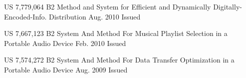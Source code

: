 \vspace{-3mm}

\begin{cvhonors}
  \cvhonor
    {US 7,779,064 B2} %
    {Method and System for Efficient and Dynamically Digitally-Encoded-Info. Distribution} %
    {Aug. 2010} %
    {Issued} %

  \cvhonor
    {US 7,667,123 B2} %
    {System And Method For Musical Playlist Selection in a Portable Audio Device} %
    {Feb. 2010} %
    {Issued} %

  \cvhonor
    {US 7,574,272 B2} %
    {System And Method For Data Transfer Optimization in a Portable Audio Device} %
    {Aug. 2009} %
    {Issued} %

\end{cvhonors}


